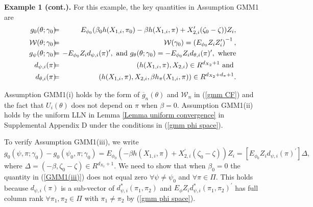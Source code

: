 \documentclass[12pt,thmsb,titlepage,final,oneside,letterpaper]{article}
\begin{document}
\noindent \textbf{Example 1 (cont.). }For this example, the key quantities
in Assumption GMM1 are 
\begin{eqnarray}
g_{0}(\theta ;\gamma _{0})\hspace{-0.08in} &=&\hspace{-0.08in}E_{\phi
_{0}}(\beta _{0}h(X_{1,i},\pi _{0})-\beta h(X_{1,i},\pi )+X_{2,i}^{\prime
}(\zeta _{0}-\zeta ))Z_{i},  \notag \\
\mathcal{W}(\theta ;\gamma _{0})\hspace{-0.08in} &=&\hspace{-0.08in}\mathcal{%
W}(\gamma _{0})=\left( E_{\phi _{0}}Z_{i}Z_{i}^{\prime }\right) ^{-1}, 
\notag \\
g_{\psi }(\theta ;\gamma _{0})\hspace{-0.08in} &=&\hspace{-0.08in}-E_{\phi
_{0}}Z_{i}d_{\psi ,i}(\pi )^{\prime },\text{ and }g_{\theta }(\theta ;\gamma
_{0})=-E_{\phi _{0}}Z_{i}d_{\theta ,i}(\pi )^{\prime },\text{ where}  \notag
\\
d_{\psi ,i}(\pi )\hspace{-0.08in} &=&\hspace{-0.08in}(h(X_{1,i},\pi
),X_{2,i})\in R^{d_{X_{2}}+1}\text{ and }  \notag \\
d_{\theta ,i}(\pi )\hspace{-0.08in} &=&\hspace{-0.08in}(h(X_{1,i},\pi
),X_{2,i},\beta h_{\pi }(X_{1,i},\pi ))\in R^{d_{X_{2}}+d_{\pi }+1}.
\label{form of g_0 and weight}
\end{eqnarray}

Assumption GMM1(i) holds by the form of $\overline{g}_{n}(\theta )$ and $%
\mathcal{W}_{n}$ in (\ref{gmm CF}) and the fact that $U_{i}(\theta )$ does
not depend on $\pi $ when $\beta =0.$ Assumption GMM1(ii) holds by the
uniform LLN in Lemma \ref{Lemma uniform convergence} in Supplemental
Appendix D under the conditions in (\ref{gmm phi space}).

To verify Assumption GMM1(iii), we write%
\begin{equation}
g_{0}(\psi ,\pi ;\gamma _{0})-g_{0}(\psi _{0},\pi ;\gamma _{0})=E_{\phi
_{0}}(-\beta h(X_{1,i},\pi )+X_{2,i}^{\prime }(\zeta _{0}-\zeta ))Z_{i}= 
\left[ E_{\phi _{0}}Z_{i}d_{\psi ,i}(\pi )^{\prime }\right] \Delta ,
\label{GMM1(iii)}
\end{equation}%
where $\Delta =(-\beta ,\zeta _{0}-\zeta )\in R^{d_{X_{2}}+1}.$ We need to
show that when $\beta _{0}=0$ the quantity in (\ref{GMM1(iii)}) does not
equal zero $\forall \psi \neq \psi _{0}$ and $\forall \pi \in \Pi .$ This
holds because $d_{\psi ,i}(\pi )$ is a sub-vector of $d_{\psi ,i}^{\ast
}(\pi _{1},\pi _{2})$ and $E_{\phi }Z_{i}d_{\psi ,i}^{\ast }(\pi _{1},\pi
_{2})^{\prime }$ has full column rank $\forall \pi _{1},\pi _{2}\in \Pi $
with $\pi _{1}\neq \pi _{2}$ by (\ref{gmm phi space}).
\end{document}
